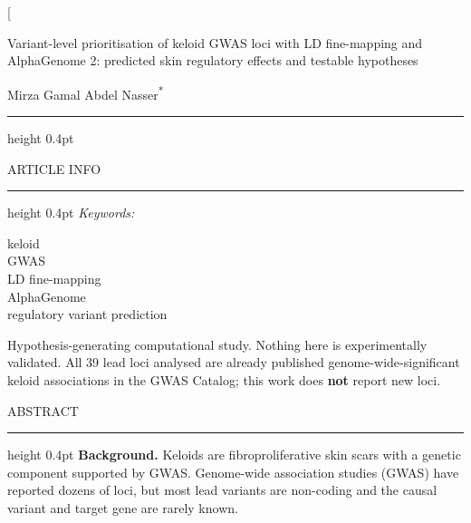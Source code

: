 \documentclass[10pt,twocolumn,a4paper]{article}
\begin{document}
\twocolumn[{%
\begin{@twocolumnfalse}
{\sffamily\fontsize{17}{21}\selectfont Variant-level prioritisation of keloid GWAS loci with LD fine-mapping and AlphaGenome 2: predicted skin regulatory effects and testable hypotheses\par}
\vspace{10pt}
{\sffamily\fontsize{11}{13}\selectfont\color{authorgrey}Mirza Gamal Abdel Nasser}\textsuperscript{\color{authorgrey}*}\par
\vspace{2pt}{\footnotesize\itshape *Corresponding author: mirzagamalabdelnasser@gmail.com\par}
\vspace{7pt}\hrule height 0.4pt\vspace{7pt}
\noindent\begin{minipage}[t]{0.235\textwidth}
{\sffamily\footnotesize{}ARTICLE INFO}\par\vspace{1pt}\hrule height 0.4pt\vspace{6pt}
{\footnotesize\itshape Keywords:}\par
{\footnotesize keloid\\GWAS\\LD fine-mapping\\AlphaGenome\\regulatory variant prediction\par}
\vspace{6pt}{\footnotesize\itshape Status:}\par
{\scriptsize\raggedright Hypothesis-generating computational study. Nothing here is experimentally validated. All 39 lead loci analysed are already published genome-wide-significant keloid associations in the GWAS Catalog; this work does \textbf{not} report new loci.\par}
\end{minipage}\hfill
\begin{minipage}[t]{0.735\textwidth}
{\sffamily\footnotesize{}ABSTRACT}\par\vspace{1pt}\hrule height 0.4pt\vspace{6pt}
\footnotesize\setlength{\parindent}{0pt}\setlength{\parskip}{3pt}
\textbf{Background.} Keloids are fibroproliferative skin scars with a genetic component supported by GWAS. Genome-wide association studies (GWAS) have reported dozens of loci, but most lead variants are non-coding and the causal variant and target gene are rarely known.


\end{minipage}
\end{@twocolumnfalse}}
\end{document}
